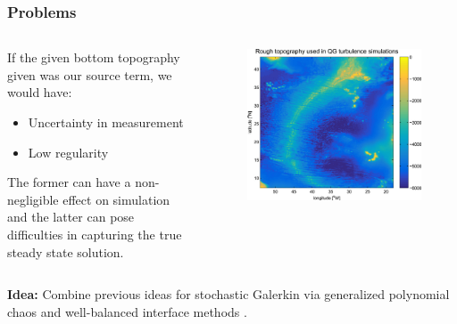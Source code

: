 \documentclass[
    pdf,
    11pt,
    xcolor={svgnames},
  ]{beamer}
\begin{document}
\begin{frame}
    \frametitle{Problems}
    \begin{columns}
    \begin{column}{0.5\textwidth}
    If the given bottom topography given was our source term, we would have:
    \begin{itemize}
        \item Uncertainty in measurement
        \item Low regularity
    \end{itemize}
    The former can have a non-negligible effect on simulation and the latter can pose difficulties in capturing the true steady state solution.
    \end{column}
    \begin{column}{0.5\textwidth}
        \begin{figure}
        \centering
        \includegraphics[width=\textwidth]{slides/bottom_topography.jpg}
        \end{figure}
    \end{column}
    \end{columns}
    \pause
    {\bf Idea:} Combine previous ideas for stochastic Galerkin via generalized polynomial chaos and well-balanced interface methods \cite{Jin2015}.
\end{frame}

\end{document}
